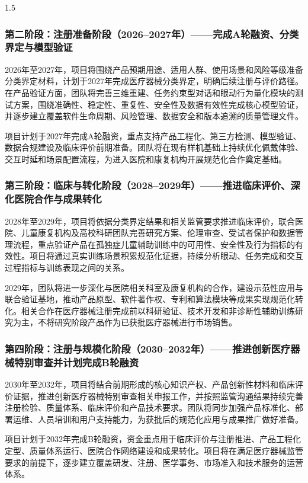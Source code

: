 \documentclass[zihao=-4]{ctexart}
\begin{document}
\begin{spacing}{1.5}
\subsubsection{第二阶段：注册准备阶段（2026--2027年）——完成A轮融资、分类界定与模型验证}

2026年至2027年，项目将围绕产品预期用途、适用人群、使用场景和风险等级准备分类界定材料，计划于2027年完成医疗器械分类界定，明确后续注册与评价路径。在产品验证方面，团队将完善三维重建、任务约束型对话和眼动行为量化模块的测试方案，围绕准确性、稳定性、重复性、安全性及数据有效性完成核心模型验证，并逐步建立覆盖软件生命周期、风险管理、数据安全和版本追溯的质量管理文件。

项目计划于2027年完成A轮融资，重点支持产品工程化、第三方检测、模型验证、数据合规建设及临床评价前期准备。团队将在现有样机基础上持续优化佩戴体验、交互时延和场景配置流程，为进入医院和康复机构开展规范化合作奠定基础。

\subsubsection{第三阶段：临床与转化阶段（2028--2029年）——推进临床评价、深化医院合作与成果转化}

2028年至2029年，项目将依据分类界定结果和相关监管要求推进临床评价，联合医院、儿童康复机构及高校科研团队完善研究方案、伦理审查、受试者保护和数据管理流程，重点验证产品在孤独症儿童辅助训练中的可用性、安全性及行为指标的有效性。项目将通过真实训练场景积累规范化证据，持续分析眼动、任务完成和交互过程指标与训练表现之间的关系。

2029年，团队将进一步深化与医院相关科室及康复机构的合作，建设示范性应用与联合验证基地，推动产品原型、软件著作权、专利和算法模块等成果实现规范化转化。相关合作在医疗器械注册完成前以科研验证、技术开发和非诊断性辅助训练研究为主，不将研究阶段产品作为已获批医疗器械进行市场销售。

\subsubsection{第四阶段：注册与规模化阶段（2030--2032年）——推进创新医疗器械特别审查并计划完成B轮融资}

2030年至2032年，项目将结合前期形成的核心知识产权、产品创新性材料和临床评价证据，推进创新医疗器械特别审查相关申报工作，并按照监管沟通结果持续完善注册检验、质量体系、临床评价和产品技术要求。团队将同步加强产品标准化、部署运维、人员培训和用户支持能力，为获批后的规范化应用与成果推广做好准备。

项目计划于2032年完成B轮融资，资金重点用于临床评价与注册推进、产品工程化定型、质量体系运行、医院合作网络建设和成果转化。项目将在满足医疗器械监管要求的前提下，逐步建立覆盖研发、注册、医学事务、市场准入和技术服务的运营体系。


\end{spacing}
\end{document}
